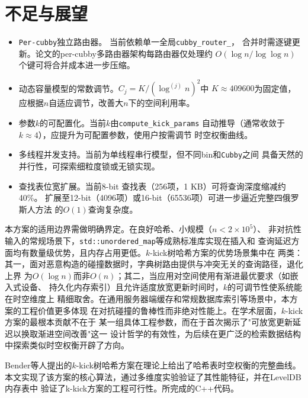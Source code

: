 \documentclass[
    type = bachelor,
    fontset = win,
    decl-page = true,
  ]{njuthesis}
\begin{document}
\section{不足与展望}

\begin{itemize}
  \item \texttt{Per-cubby}独立路由器。\newline
    当前依赖单一全局\texttt{cubby\_router\_}，
    合并时需逐键更新。论文\cite{1}的per-cubby多路由器架构每路由器仅处理约
    $O(\log n/\log\log n)$个键可将合并成本进一步压缩。
  \item 动态容量模型的常数调节。$C_j=K/(\log^{(j)}n)^2$中
    $K\approx 409600$为固定值，应根据$n$自适应调节，改善大$n$下的空间利用率。
  \item 参数$k$的可配置化。当前$k$由\texttt{compute\_kick\_params}
    自动推导（通常收敛于$k\approx 4$），应提升为可配置参数，使用户按需调节
    时空权衡曲线。
  \item 多线程并发支持。当前为单线程串行模型，但不同bin和\texttt{Cubby}之间
    具备天然的并行性，可探索细粒度锁或无锁实现。
  \item 查找表位宽扩展。当前8-bit 查找表（256项，1 KB）可将查询深度缩减约40\%。
    扩展至12-bit（4096项）或16-bit（65536项）可进一步逼近完整四俄罗斯人方法\cite{7}
    的$O(1)$查询复杂度。
\end{itemize}

\noindent 本方案的适用边界需做明确界定。在良好哈希、小规模（$n<2\times10^5$）、
非对抗性输入的常规场景下，\texttt{std::unordered\_map}等成熟标准库实现在插入和
查询延迟方面均有数量级优势，且内存占用更低。$k$-kick树哈希方案的优势场景集中在
两类：其一，面对恶意构造的碰撞数据时，字典树路由提供与冲突无关的查询路径，退化上界
为$O(\log n)$而非$O(n)$；其二，当应用对空间使用有渐进最优要求（如嵌入式设备、
持久化内存索引）且允许适度放宽更新时间时，$k$的可调节性使系统能在时空维度上
精细取舍。在通用服务器端缓存和常规数据库索引等场景中，本方案的工程价值更多体现
在对抗碰撞的鲁棒性而非绝对性能上。在学术层面，$k$-kick方案的最根本贡献不在于
某一组具体工程参数，而在于首次揭示了"可放宽更新延迟以换取渐进空间改善"这一
设计哲学的有效性，为后续在更广泛的检索数据结构中探索类似时空权衡开辟了方向。

\noindent Bender等人提出的$k$-kick树哈希方案在理论上给出了哈希表时空权衡的完整曲线。
本文实现了该方案的核心算法，通过多维度实验验证了其性能特征，并在LevelDB 内存表中
验证了k-kick方案的工程可行性。所完成的C++代码。

\end{document}
